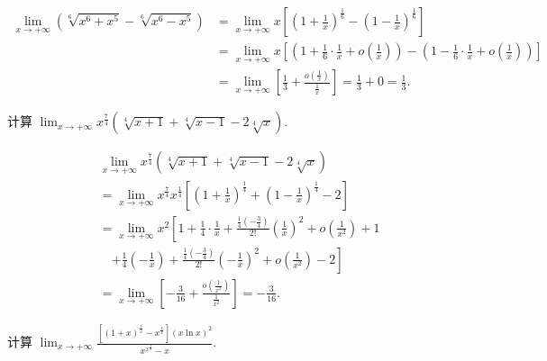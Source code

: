 \begin{solution}
\begin{align*}
\lim_{x\to+\infty}\left(\sqrt[6]{x^6+x^5}-\sqrt[6]{x^6-x^5}\right)
&= \lim_{x\to+\infty}x\left[\left(1+\frac{1}{x}\right)^{\frac{1}{6}}-\left(1-\frac{1}{x}\right)^{\frac{1}{6}}\right] \\
&= \lim_{x\to+\infty}x\left[\left(1+\frac{1}{6}\cdot\frac{1}{x}+o\left(\frac{1}{x}\right)\right)-\left(1-\frac{1}{6}\cdot\frac{1}{x}+o\left(\frac{1}{x}\right)\right)\right] \\
&= \lim_{x\to+\infty}\left[\frac{1}{3}+\frac{o\left(\frac{1}{x}\right)}{\frac{1}{x}}\right]=\frac{1}{3}+0=\frac{1}{3}.
\end{align*}
\end{solution}

\begin{example}\label{ex:4.2.5}
计算 $\lim_{x\to+\infty}x^{\frac{7}{4}}\left(\sqrt[4]{x+1}+\sqrt[4]{x-1}-2\sqrt[4]{x}\right)$.
\end{example}

\begin{solution}
\begin{align*}
&\lim_{x\to+\infty}x^{\frac{7}{4}}\left(\sqrt[4]{x+1}+\sqrt[4]{x-1}-2\sqrt[4]{x}\right) \\
&= \lim_{x\to+\infty}x^{\frac{7}{4}}x^{\frac{1}{4}}\left[\left(1+\frac{1}{x}\right)^{\frac{1}{4}}+\left(1-\frac{1}{x}\right)^{\frac{1}{4}}-2\right] \\
&= \lim_{x\to+\infty}x^2\left[1+\frac{1}{4}\cdot\frac{1}{x}+\frac{\frac{1}{4}\left(-\frac{3}{4}\right)}{2!}\left(\frac{1}{x}\right)^2+o\left(\frac{1}{x^2}\right)+1\right. \\
&\quad \left.+\frac{1}{4}\left(-\frac{1}{x}\right)+\frac{\frac{1}{4}\left(-\frac{3}{4}\right)}{2!}\left(-\frac{1}{x}\right)^2+o\left(\frac{1}{x^2}\right)-2\right] \\
&= \lim_{x\to+\infty}\left[-\frac{3}{16}+\frac{o\left(\frac{1}{x^{2}}\right)}{\frac{1}{x^{2}}}\right]=-\frac{3}{16}.
\end{align*}
\end{solution}

\begin{example}\label{ex:4.2.6}
计算 $\lim_{x\to+\infty}\frac{\left[(1+x)^{\frac{1}{x}}-x^{\frac{1}{x}}\right](x\ln x)^2}{x^{x^{\frac{1}{x}}}-x}$.
\end{example}

